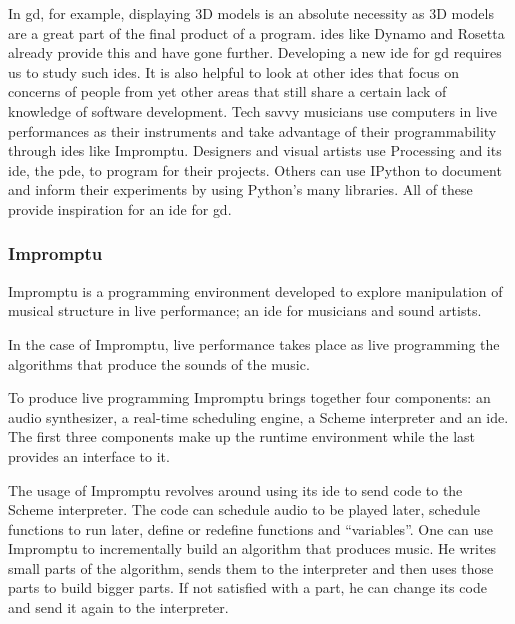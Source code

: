 \documentclass{./llncs2e/llncs}
\begin{document}
	In \ac{gd}, for example, displaying 3D models is an absolute necessity as 3D models are a great part of the final product of a program.
	\ac{ide}s like Dynamo and Rosetta already provide this and have gone further.
	Developing a new \ac{ide} for \ac{gd} requires us to study such \ac{ide}s.
	It is also helpful to look at other \ac{ide}s that focus on concerns of people from yet other areas that still share a certain lack of knowledge of software development.
	Tech savvy musicians use computers in live performances as their instruments and take advantage of their programmability through \ac{ide}s like Impromptu.
	Designers and visual artists use Processing and its \ac{ide}, the \ac{pde}, to program for their projects.
	Others can use IPython to document and inform their experiments by using Python's many libraries.
	All of these provide inspiration for an \ac{ide} for \ac{gd}.
	
\subsubsection{Impromptu\cite{sorensen2005impromptu}\cite{sorensen2010programming}}
	Impromptu is a programming environment developed to explore manipulation of musical structure in live performance; an \ac{ide} for musicians and sound artists.
	
	In the case of Impromptu, live performance takes place as live programming the algorithms that produce the sounds of the music.
	
	To produce live programming Impromptu brings together four components: an audio synthesizer, a real-time scheduling engine, a Scheme interpreter and an \ac{ide}. 
	The first three components make up the runtime environment while the last provides an interface to it. 
	
	The usage of Impromptu revolves around using its \ac{ide} to send code to the Scheme interpreter. 
	The code can schedule audio to be played later, schedule functions to run later, define or redefine functions and ``variables''. 
	One can use Impromptu to incrementally build an algorithm that produces music. 
	He writes small parts of the algorithm, sends them to the interpreter and then uses those parts to build bigger parts. 
	If not satisfied with a part, he can change its code and send it again to the interpreter.
	
	
\end{document}
